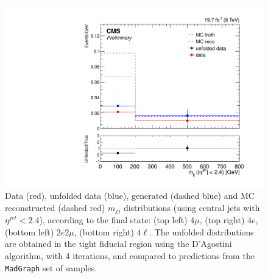 \begin{figure}[hbtp]
\begin{center}
    \includegraphics[width=\cmsFigWidth]{Figures/CentralMjj_ZZTo4l_Mad_fr}      
    \caption{\footnotesize{Data (red), unfolded data (blue), generated (dashed blue) and MC reconstructed (dashed red) $m_{jj}$ distributions (using central jets with $\eta^{jet}<2.4$), according to the final state: (top left) $4\mu$, (top right) $4e$, (bottom left) $2e2\mu$, (bottom right) $4\ell$. The unfolded distributions are obtained in the tight fiducial region using the D'Agostini algorithm, with 4 iterations, and compared to predictions from the \texttt{MadGraph} set of samples.}} 
    \label{fig:CentralMjj_unfolding}
  \end{center}
\end{figure}

